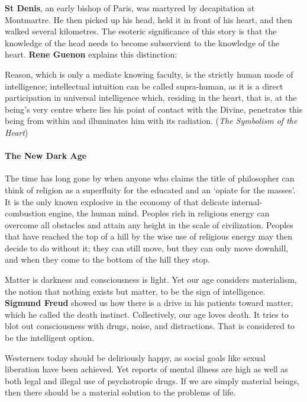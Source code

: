 \textbf{St Denis}, an early bishop of Paris, was martyred by decapitation at Montmartre. He then picked up his head, held it in front of his heart, and then walked several kilometres. The esoteric significance of this story is that the knowledge of the head needs to become subservient to the knowledge of the heart. \textbf{Rene Guenon} explains this distinction:

\begin{quotex}
Reason, which is only a mediate knowing faculty, is the strictly human mode of intelligence; intellectual intuition can be called supra-human, as it is a direct participation in universal intelligence which, residing in the heart, that is, at the being's very centre where lies his point of contact with the Divine, penetrates this being from within and illuminates him with its radiation. (\emph{The Symbolism of the Heart})

\end{quotex}
\paragraph{The New Dark Age}
\begin{quotex}
The time has long gone by when anyone who claims the title of philosopher can think of religion as a superfluity for the educated and an `opiate for the masses'. It is the only known explosive in the economy of that delicate internal-combustion engine, the human mind. Peoples rich in religious energy can overcome all obstacles and attain any height in the scale of civilization. Peoples that have reached the top of a hill by the wise use of religious energy may then decide to do without it; they can still move, but they can only move downhill, and when they come to the bottom of the hill they stop. 

\end{quotex}
Matter is darkness and consciousness is light. Yet our age considers materialism, the notion that nothing exists but matter, to be the sign of intelligence. \textbf{Sigmund Freud} showed us how there is a drive in his patients toward matter, which he called the death instinct. Collectively, our age loves death. It tries to blot out consciousness with drugs, noise, and distractions. That is considered to be the intelligent option.

Westerners today should be deliriously happy, as social goals like sexual liberation have been achieved. Yet reports of mental illness are high as well as both legal and illegal use of psychotropic drugs. If we are simply material beings, then there should be a material solution to the problems of life.

